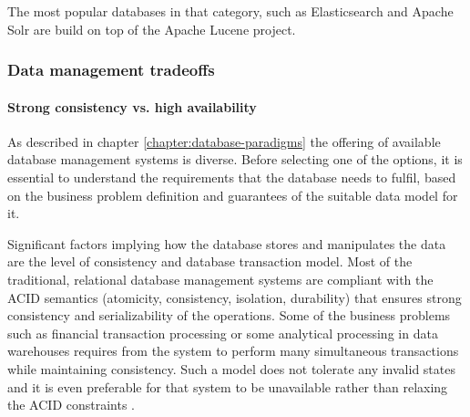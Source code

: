 The most popular databases in that category, such as Elasticsearch \cite{Elasticsearch} and Apache Solr \cite{ApacheSolr} are build on top of the Apache Lucene project.

\subsubsection{Data management tradeoffs} \label{chapter:database-management-tradeoffs}



\paragraph{Strong consistency vs. high availability}

As described in chapter \ref{chapter:database-paradigms} the offering of available database management systems is diverse. Before selecting one of the options, it is essential to understand the requirements that the database needs to fulfil, based on the business problem definition and guarantees of the suitable data model for it. 

Significant factors implying how the database stores and manipulates the data are the level of consistency and database transaction model. Most of the traditional, relational database management systems are compliant with the ACID semantics (atomicity, consistency, isolation, durability) that ensures strong consistency and serializability of the operations. Some of the business problems such as financial transaction processing or some analytical processing in data warehouses requires from the system to perform many simultaneous transactions while maintaining consistency. Such a model does not tolerate any invalid states and it is even preferable for that system to be unavailable rather than relaxing the ACID constraints \cite{PerspectivesOnArchitectureEvolution}.

